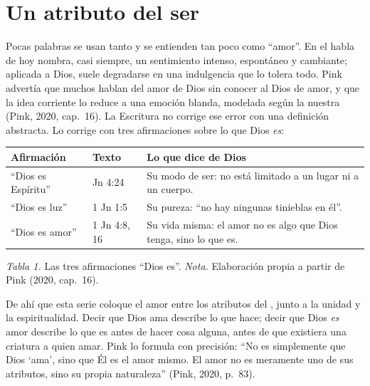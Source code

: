 
\section{Un atributo del ser}

Pocas palabras se usan tanto y se entienden tan poco como ``amor''. En el habla de hoy nombra, casi siempre, un sentimiento intenso, espontáneo y cambiante; aplicada a Dios, suele degradarse en una indulgencia que lo tolera todo. Pink advertía que muchos hablan del amor de Dios sin conocer al Dios de amor, y que la idea corriente lo reduce a una emoción blanda, modelada según la nuestra (Pink, 2020, cap.~16). La Escritura no corrige ese error con una definición abstracta. Lo corrige con tres afirmaciones sobre lo que Dios \emph{es}:

\begin{center}\small\renewcommand{\arraystretch}{1.2}
\begin{tabular}{@{}L{3.6cm}L{3.0cm}L{8.2cm}@{}}
\toprule
\textbf{Afirmación} & \textbf{Texto} & \textbf{Lo que dice de Dios} \\ \midrule
``Dios es Espíritu'' & Jn 4:24 & Su modo de ser: no está limitado a un lugar ni a un cuerpo. \\
``Dios es luz'' & 1 Jn 1:5 & Su pureza: ``no hay ningunas tinieblas en él''. \\
``Dios es amor'' & 1 Jn 4:8, 16 & Su vida misma: el amor no es algo que Dios tenga, sino lo que es. \\
\bottomrule
\end{tabular}\par
{\footnotesize\color{gris}\textit{Tabla 1.} Las tres afirmaciones ``Dios es''. \textit{Nota.} Elaboración propia a partir de Pink (2020, cap.~16).}
\end{center}

De ahí que esta serie coloque el amor entre los atributos del , junto a la unidad y la espiritualidad. Decir que Dios ama describe lo que hace; decir que Dios \emph{es} amor describe lo que es antes de hacer cosa alguna, antes de que existiera una criatura a quien amar. Pink lo formula con precisión: ``No es simplemente que Dios `ama', sino que Él es el amor mismo. El amor no es meramente uno de sus atributos, sino su propia naturaleza'' (Pink, 2020, p.~83).

